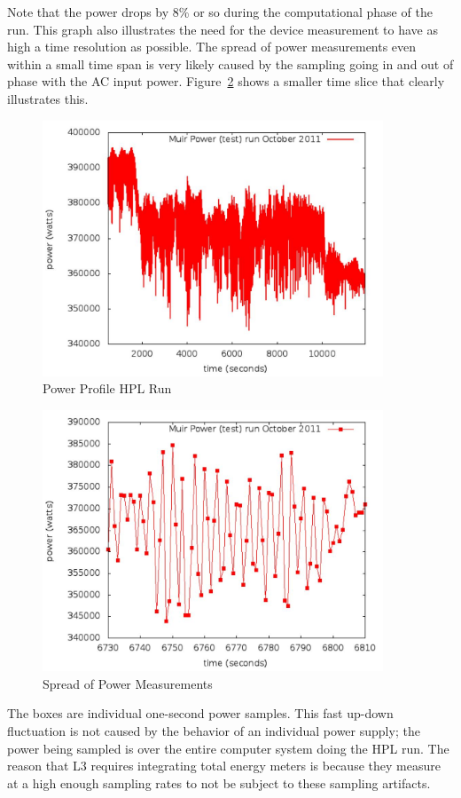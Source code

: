 \noindent
Note that the power drops by 8\% or so during the computational phase of the run.
This graph also illustrates the need for the device measurement to have as high a time resolution as possible.
The spread of power measurements even within a small time span is very likely caused by the sampling going in and out of phase with the AC input power.
Figure~\ref{fig:sopm} shows a smaller time slice that clearly illustrates this.
\wl


\begin{figure}
\centering
\includegraphics[width=4in]{fig3-1}
\caption{Power Profile HPL Run}
\label{fig:powprof}
\end{figure}

\begin{figure}
\centering
\includegraphics[width=4in]{fig3-2}
\caption{Spread of Power Measurements}
\label{fig:sopm}
\end{figure}

\noindent
The boxes are individual one-second power samples.
This fast up-down fluctuation is not caused by the behavior of an individual power supply; the power being sampled is over the entire computer system doing the HPL run.
The reason that L3 requires integrating total energy meters is because they measure at a high enough sampling rates to not be subject to these sampling artifacts.
\wl

